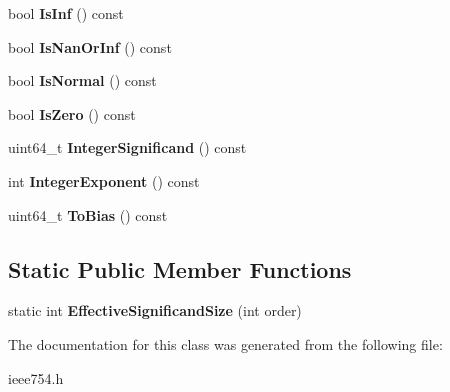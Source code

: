 \begin{DoxyCompactItemize}
\item 
bool {\bfseries Is\+Inf} () const \hypertarget{a00078_a2efab47ffbfa75e0fca1129263b86545}{}\label{a00078_a2efab47ffbfa75e0fca1129263b86545}

\item 
bool {\bfseries Is\+Nan\+Or\+Inf} () const \hypertarget{a00078_a5b5cc0b8552246f9e274b00a010bd676}{}\label{a00078_a5b5cc0b8552246f9e274b00a010bd676}

\item 
bool {\bfseries Is\+Normal} () const \hypertarget{a00078_ac34b7871eeb80d2b6bac48f144c97b51}{}\label{a00078_ac34b7871eeb80d2b6bac48f144c97b51}

\item 
bool {\bfseries Is\+Zero} () const \hypertarget{a00078_a6eb58f2690af582efeb9b76ef35c4c60}{}\label{a00078_a6eb58f2690af582efeb9b76ef35c4c60}

\item 
uint64\+\_\+t {\bfseries Integer\+Significand} () const \hypertarget{a00078_a96c5e0f06551e83565b5097950d30e32}{}\label{a00078_a96c5e0f06551e83565b5097950d30e32}

\item 
int {\bfseries Integer\+Exponent} () const \hypertarget{a00078_a8e16ee31d521fb56f0b98be427a9d47e}{}\label{a00078_a8e16ee31d521fb56f0b98be427a9d47e}

\item 
uint64\+\_\+t {\bfseries To\+Bias} () const \hypertarget{a00078_af8b543dc813f761d274824f7cef00a43}{}\label{a00078_af8b543dc813f761d274824f7cef00a43}

\end{DoxyCompactItemize}
\subsection*{Static Public Member Functions}
\begin{DoxyCompactItemize}
\item 
static int {\bfseries Effective\+Significand\+Size} (int order)\hypertarget{a00078_aa710fa4f5e06b0ff4348a13475688f13}{}\label{a00078_aa710fa4f5e06b0ff4348a13475688f13}

\end{DoxyCompactItemize}


The documentation for this class was generated from the following file\+:\begin{DoxyCompactItemize}
\item 
ieee754.\+h\end{DoxyCompactItemize}
